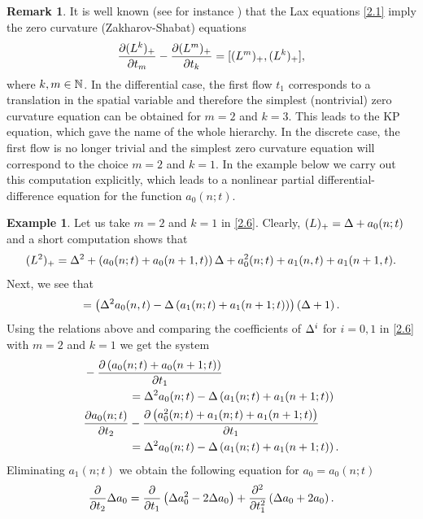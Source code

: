 \documentclass[11pt,reqno]{amsart}
\theoremstyle{definition}
\newtheorem{Remark}[Theorem]{Remark}
\newtheorem{Example}[Theorem]{Example}
\numberwithin{equation}{section}
\begin{document}
\begin{Remark}\label{re2.1} It is well known (see for instance 
\cite[Proposition 5.1.4, p.~75]{Di}) that the Lax equations 
\eqref{2.1} imply the zero curvature (Zakharov-Shabat) equations
\begin{equation}\label{2.6}
\frac{\partial (L^k)_+}{\partial t_m}-\frac{\partial (L^m)_+}{\partial t_k}=[(L^m)_+,(L^k)_+],
\end{equation}
where $k,m\in\mathbb N$. In the differential case, the first flow $t_1$ corresponds 
to a translation in the spatial variable and therefore the simplest 
(nontrivial) zero curvature equation can be obtained for $m=2$ and $k=3$. This 
leads to the KP equation, which gave the name of the whole hierarchy. In the 
discrete case, the first flow is no longer trivial and the simplest zero 
curvature equation will correspond to the choice $m=2$ and $k=1$. In the 
example below we carry out this computation explicitly, which leads to a 
nonlinear partial differential-difference equation for the function $a_0(n;t)$.
\end{Remark}

\begin{Example}\label{ex2.2} Let us take $m=2$ and $k=1$ in \eqref{2.6}. 
Clearly, $(L)_+=\Delta+a_0(n;t)$ and a short computation shows that 
$$(L^2)_+=\Delta^2+\left(a_0(n;t)+a_0(n+1,t)\right)\Delta+
a_0^2(n;t)+a_1(n,t)+a_1(n+1,t).$$
Next, we see that 
\begin{equation*}
[(L^2)_+,(L)_+]=\left(\De^2 a_0(n,t)-\De\left(a_1(n;t)+a_1(n+1;t)\right)\right)
\left(\De+1\right).
\end{equation*}
Using the relations above and comparing the coefficients of $\Delta^i$ for 
$i=0,1$ in \eqref{2.6} with $m=2$ and $k=1$ we get the system
\begin{align*}
&-\frac{\partial \left(a_0(n;t)+a_0(n+1;t)\right)}{\partial t_1}\\
&\qquad\qquad=\Delta^2a_0(n;t)-\Delta\left(a_1(n;t)+a_1(n+1;t)\right)\\
&\frac{\partial a_0(n;t)}{\partial t_2}
-\frac{\partial \left(a_0^2(n;t)+a_1(n;t)+a_1(n+1;t)\right)}{\partial t_1}\\ 
&\qquad\qquad=\Delta^2a_0(n;t)-\Delta\left(a_1(n;t)+a_1(n+1;t)\right).
\end{align*}
Eliminating $a_1(n;t)$ we obtain the following 
equation for $a_0=a_0(n;t)$
\begin{equation}\label{2.7}
\frac{\partial }{\partial t_2}\Delta a_0=\frac{\partial }{\partial t_1}\left(\Delta a_0^2-2\Delta a_0\right)
+\frac{\partial^2 }{\partial t_1^2}\left(\Delta a_0+2a_0\right).
\end{equation}
\end{Example}
\end{document}
